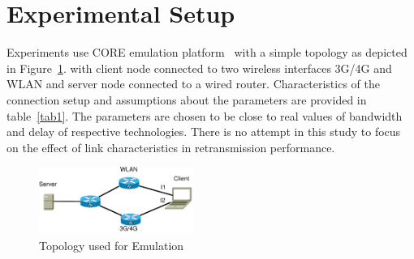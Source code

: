\documentclass[10pt,draftcls,twocolumn]{IEEEconf}
\begin{document}
\section{Experimental Setup}\label{exsetup}

Experiments use CORE emulation platform~\cite{CORE} with a simple topology as depicted in Figure~\ref{fig1}.
with client node connected to two wireless interfaces 3G/4G and WLAN and server node connected to a wired router.
Characteristics of the connection setup and assumptions about the parameters are provided in table~\ref{tab1}.
The parameters are chosen to be close to real values of bandwidth and delay of respective technologies.
There is no attempt in this study to focus on the effect of link characteristics in retransmission performance.

 
\begin{figure}[!ht]
\begin{center}
\includegraphics[angle=0, width=0.45\textwidth]{images/fortest.pdf}
\caption{Topology used for Emulation}\label{fig1}
\end{center}
\end{figure}
\begin{center}

\begin{table}
\end{table}
\end{center}
\end{document}
